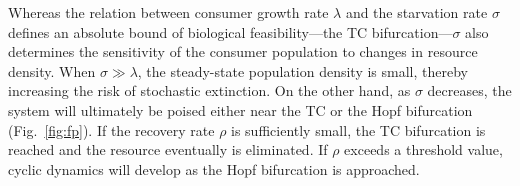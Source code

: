 \documentclass{pnastwo}
\begin{document}
\begin{article}
Whereas the relation between consumer growth rate $\lambda$ and the starvation rate $\sigma$ defines an absolute bound of biological feasibility---the TC bifurcation---$\sigma$ also determines the sensitivity of the consumer population to changes in resource density.  
When $\sigma\gg\lambda$, the steady-state population density is small, thereby increasing the risk of stochastic extinction.  
On the other hand, as $\sigma$ decreases, the system will ultimately be poised either near the TC or the Hopf bifurcation (Fig.~\ref{fig:fp}).  
If the recovery rate $\rho$ is sufficiently small, the TC bifurcation is reached and the resource eventually is eliminated.  
If $\rho$ exceeds a threshold value, cyclic dynamics will develop as the Hopf bifurcation is approached.
\\

%




\end{article}
\end{document}
